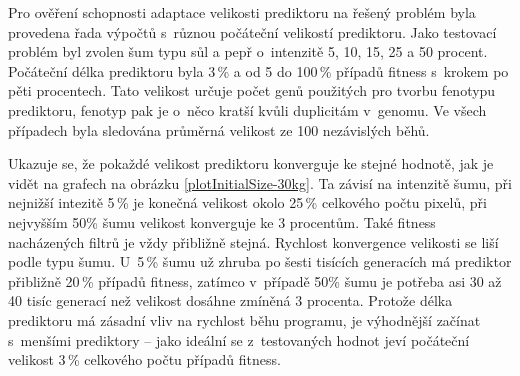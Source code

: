 Pro ověření schopnosti adaptace velikosti prediktoru na řešený problém byla provedena řada výpočtů s~různou počáteční velikostí prediktoru. Jako testovací problém byl zvolen šum typu sůl a pepř o~intenzitě 5, 10, 15, 25 a 50 procent. Počáteční délka prediktoru byla 3\,\% a od 5 do 100\,\% případů fitness s~krokem po pěti procentech. Tato velikost určuje počet genů použitých pro tvorbu fenotypu prediktoru, fenotyp pak je o~něco kratší kvůli duplicitám v~genomu. Ve všech případech byla sledována průměrná velikost ze 100 nezávislých běhů.

Ukazuje se, že pokaždé velikost prediktoru konverguje ke stejné hodnotě, jak je vidět na grafech na obrázku \ref{plotInitialSize-30kg}. Ta závisí na intenzitě šumu, při nejnižší intezitě 5\,\% je konečná velikost okolo 25\,\% celkového počtu pixelů, při nejvyšším 50\% šumu velikost konverguje ke 3 procentům. Také fitness nacházených filtrů je vždy přibližně stejná. Rychlost konvergence velikosti se liší podle typu šumu. U~5\,\% šumu už zhruba po šesti tisících generacích má prediktor přibližně 20\,\% případů fitness, zatímco v~případě 50\% šumu je potřeba asi 30 až 40 tisíc generací než velikost dosáhne zmíněná 3 procenta. Protože délka prediktoru má zásadní vliv na rychlost běhu programu, je výhodnější začínat s~menšími prediktory -- jako ideální se z~testovaných hodnot jeví počáteční velikost 3\,\% celkového počtu případů fitness.


